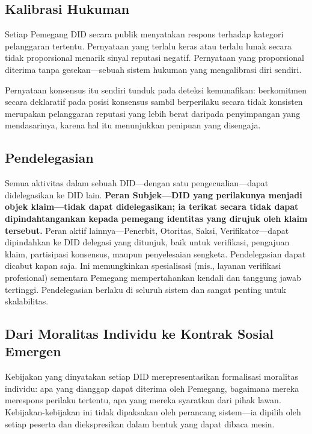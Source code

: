 \documentclass[11pt,a4paper,twocolumn]{article}
\begin{document}
\subsection{Kalibrasi Hukuman}

Setiap Pemegang DID secara publik menyatakan respons terhadap kategori pelanggaran tertentu. Pernyataan yang terlalu keras atau terlalu lunak secara tidak proporsional menarik sinyal reputasi negatif. Pernyataan yang proporsional diterima tanpa gesekan---sebuah sistem hukuman yang mengalibrasi diri sendiri.

Pernyataan konsensus itu sendiri tunduk pada deteksi kemunafikan: berkomitmen secara deklaratif pada posisi konsensus sambil berperilaku secara tidak konsisten merupakan pelanggaran reputasi yang lebih berat daripada penyimpangan yang mendasarinya, karena hal itu menunjukkan penipuan yang disengaja.

\subsection{Pendelegasian}

Semua aktivitas dalam sebuah DID---dengan satu pengecualian---dapat didelegasikan ke DID lain. \textbf{Peran Subjek---DID yang perilakunya menjadi objek klaim---tidak dapat didelegasikan; ia terikat secara tidak dapat dipindahtangankan kepada pemegang identitas yang dirujuk oleh klaim tersebut.} Peran aktif lainnya---Penerbit, Otoritas, Saksi, Verifikator---dapat dipindahkan ke DID delegasi yang ditunjuk, baik untuk verifikasi, pengajuan klaim, partisipasi konsensus, maupun penyelesaian sengketa. Pendelegasian dapat dicabut kapan saja. Ini memungkinkan spesialisasi (mis., layanan verifikasi profesional) sementara Pemegang mempertahankan kendali dan tanggung jawab tertinggi. Pendelegasian berlaku di seluruh sistem dan sangat penting untuk skalabilitas.

\subsection{Dari Moralitas Individu ke Kontrak Sosial Emergen}

Kebijakan yang dinyatakan setiap DID merepresentasikan formalisasi moralitas individu: apa yang dianggap dapat diterima oleh Pemegang, bagaimana mereka merespons perilaku tertentu, apa yang mereka syaratkan dari pihak lawan. Kebijakan-kebijakan ini tidak dipaksakan oleh perancang sistem---ia dipilih oleh setiap peserta dan diekspresikan dalam bentuk yang dapat dibaca mesin.
\end{document}
